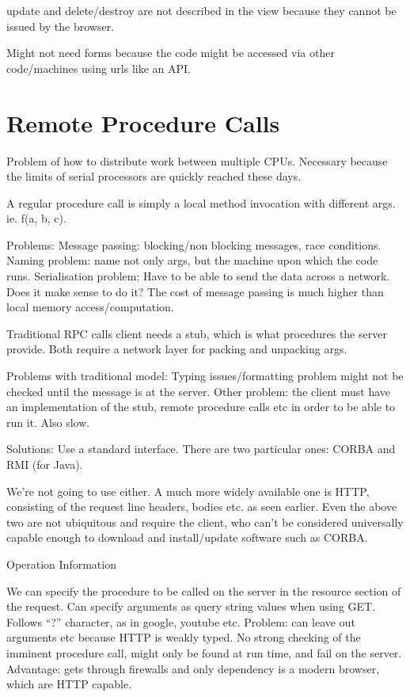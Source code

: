 \documentclass[11pt]{article}
\begin{document}
update and delete/destroy are not described in the view because they cannot be issued by the browser.

Might not need forms because the code might be accessed via other code/machines using urls like an API.

\section{Remote Procedure Calls}
\label{sec:RPC}

Problem of how to distribute work between multiple CPUs. Necessary because the limits of serial processors are quickly reached these days.

A regular procedure call is simply a local method invocation with different args. ie. f(a, b, c).

Problems:
Message passing: blocking/non blocking messages, race conditions.
Naming problem: name not only args, but the machine upon which the code runs.
Serialisation problem: Have to be able to send the data across a network.
Does it make sense to do it? The cost of message passing is much higher than local memory access/computation.

Traditional RPC calls client needs a stub, which is what procedures the server provide. Both require a network layer for packing and unpacking args.

Problems with traditional model:
Typing issues/formatting problem might not be checked until the message is at the server.
Other problem: the client must have an implementation of the stub, remote procedure calls etc in order to be able to run it.
Also slow.

Solutions:
Use a standard interface. There are two particular ones: CORBA and RMI (for Java). 

We’re not going to use either. A much more widely available one is HTTP, consisting of the request line headers, bodies etc. as seen earlier. Even the above two are not ubiquitous and require the client, who can’t be considered universally capable enough to download and install/update software such as CORBA.

Operation Information

We can specify the procedure to be called on the server in the resource section of the request.
Can specify arguments as query string values when using GET. Follows “?” character, as in google, youtube etc. Problem: can leave out arguments etc because HTTP is weakly typed. No strong checking of the imminent procedure call, might only be found at run time, and fail on the server. Advantage: gets through firewalls and only dependency is a modern browser, which are HTTP capable.
\end{document}
